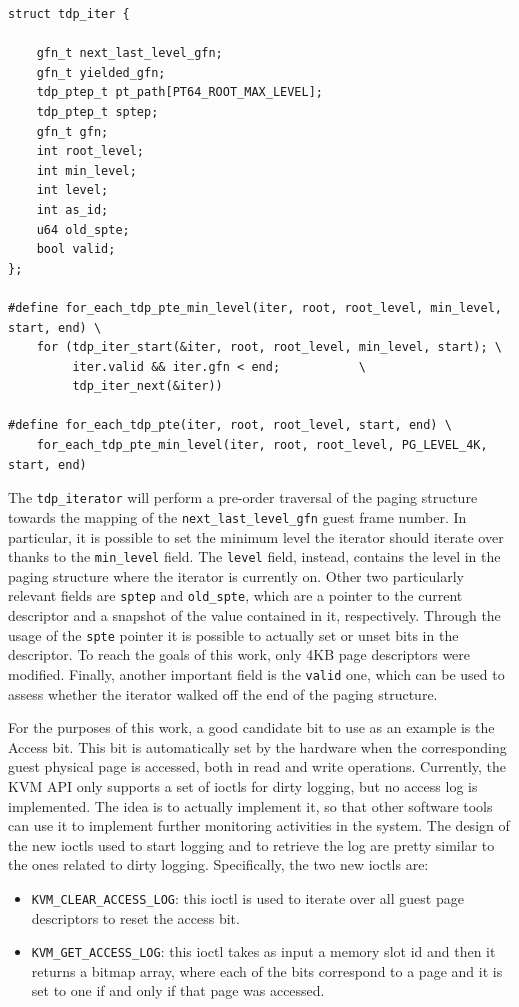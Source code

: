 \begin{lstlisting}[style=c, caption={\texttt{tdp\_iter} struct and related macros}, label={list:tdp-iter}]
struct tdp_iter {

	gfn_t next_last_level_gfn;
	gfn_t yielded_gfn;
	tdp_ptep_t pt_path[PT64_ROOT_MAX_LEVEL];
	tdp_ptep_t sptep;
	gfn_t gfn;
	int root_level;
	int min_level;
	int level;
	int as_id;
	u64 old_spte;
	bool valid;
};

#define for_each_tdp_pte_min_level(iter, root, root_level, min_level, start, end) \
	for (tdp_iter_start(&iter, root, root_level, min_level, start); \
	     iter.valid && iter.gfn < end;		     \
	     tdp_iter_next(&iter))

#define for_each_tdp_pte(iter, root, root_level, start, end) \
	for_each_tdp_pte_min_level(iter, root, root_level, PG_LEVEL_4K, start, end)

\end{lstlisting}
The \texttt{tdp\_iterator} will perform a pre-order traversal of the paging structure towards the mapping of the \texttt{next\_last\_level\_gfn} guest frame number. In particular, it is possible to set the minimum level the iterator should iterate over thanks to the \texttt{min\_level} field. The \texttt{level} field, instead, contains the level in the paging structure where the iterator is currently on. Other two particularly relevant fields are \texttt{sptep} and \texttt{old\_spte}, which are a pointer to the current descriptor and a snapshot of the value contained in it, respectively. Through the usage of the \texttt{spte} pointer it is possible to actually set or unset bits in the descriptor. To reach the goals of this work, only 4KB page descriptors were modified. Finally, another important field is the \texttt{valid} one, which can be used to assess whether the iterator walked off the end of the paging structure.
\par 
For the purposes of this work, a good candidate bit to use as an example is the Access bit. This bit is automatically set by the hardware when the corresponding guest physical page is accessed, both in read and write operations. Currently, the KVM API only supports a set of ioctls for dirty logging, but no access log is implemented. The idea is to actually implement it, so that other software tools can use it to implement further monitoring activities in the system. The design of the new ioctls used to start logging and to retrieve the log are pretty similar to the ones related to dirty logging. Specifically, the two new ioctls are: 
\begin{itemize}
    \item \texttt{KVM\_CLEAR\_ACCESS\_LOG}: this ioctl is used to iterate over all guest page descriptors to reset the access bit. 
    \item \texttt{KVM\_GET\_ACCESS\_LOG}: this ioctl takes as input a memory slot id and then it returns a bitmap array, where each of the bits correspond to a page and it is set to one if and only if that page was accessed.
\end{itemize}
